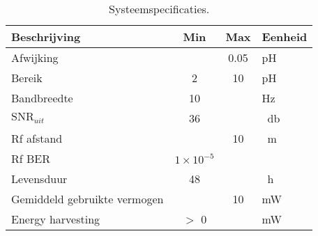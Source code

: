 \begin{table}[!htbp]
    \centering
    \begin{tabular}{|l|c c|l|}
        \hline
        Beschrijving                    & Min               & Max   & Eenheid           \\
        \hline
        Afwijking                       &                   & 0.05  & pH                \\
        Bereik                          & 2                 & 10    & pH                \\
        Bandbreedte                     & 10                &       & Hz                \\
        $\mathrm{SNR}_{uit}$            & 36                &       & \qty{}{\decibel}  \\
        Rf afstand                      &                   & 10    & \qty{}{\meter}    \\
        Rf BER                          & $1\times10^{-5}$  &       &                   \\
        Levensduur                      & 48                &       & \qty{}{\hour}     \\
        Gemiddeld gebruikte vermogen    &                   & 10    & mW                \\
        Energy harvesting               & $>$ 0             &       & mW                \\
        \hline
    \end{tabular}
    \caption{Systeemspecificaties.}
    \label{tab:systemSpecs}
\end{table}








